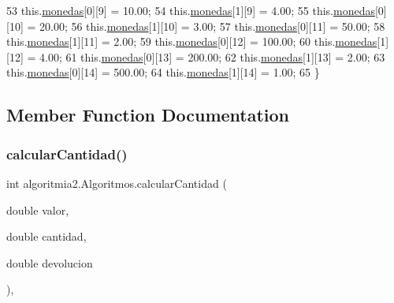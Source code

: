 \begin{DoxyCode}
53         this.\mbox{\hyperlink{classalgoritmia2_1_1_algoritmos_a7c670acfc4ef3b85c2e6908773014a13}{monedas}}[0][9] = 10.00;
54         this.\mbox{\hyperlink{classalgoritmia2_1_1_algoritmos_a7c670acfc4ef3b85c2e6908773014a13}{monedas}}[1][9] = 4.00;
55         this.\mbox{\hyperlink{classalgoritmia2_1_1_algoritmos_a7c670acfc4ef3b85c2e6908773014a13}{monedas}}[0][10] = 20.00;
56         this.\mbox{\hyperlink{classalgoritmia2_1_1_algoritmos_a7c670acfc4ef3b85c2e6908773014a13}{monedas}}[1][10] = 3.00;
57         this.\mbox{\hyperlink{classalgoritmia2_1_1_algoritmos_a7c670acfc4ef3b85c2e6908773014a13}{monedas}}[0][11] = 50.00;
58         this.\mbox{\hyperlink{classalgoritmia2_1_1_algoritmos_a7c670acfc4ef3b85c2e6908773014a13}{monedas}}[1][11] = 2.00;
59         this.\mbox{\hyperlink{classalgoritmia2_1_1_algoritmos_a7c670acfc4ef3b85c2e6908773014a13}{monedas}}[0][12] = 100.00;
60         this.\mbox{\hyperlink{classalgoritmia2_1_1_algoritmos_a7c670acfc4ef3b85c2e6908773014a13}{monedas}}[1][12] = 4.00;
61         this.\mbox{\hyperlink{classalgoritmia2_1_1_algoritmos_a7c670acfc4ef3b85c2e6908773014a13}{monedas}}[0][13] = 200.00;
62         this.\mbox{\hyperlink{classalgoritmia2_1_1_algoritmos_a7c670acfc4ef3b85c2e6908773014a13}{monedas}}[1][13] = 2.00;
63         this.\mbox{\hyperlink{classalgoritmia2_1_1_algoritmos_a7c670acfc4ef3b85c2e6908773014a13}{monedas}}[0][14] = 500.00;
64         this.\mbox{\hyperlink{classalgoritmia2_1_1_algoritmos_a7c670acfc4ef3b85c2e6908773014a13}{monedas}}[1][14] = 1.00;
65     \}
\end{DoxyCode}


\subsection{Member Function Documentation}
\mbox{\label{classalgoritmia2_1_1_algoritmos_ae8d80e3ad2158cb6743bafa0ebbbe3bb}} 
\subsubsection{\texorpdfstring{calcular\+Cantidad()}{calcularCantidad()}}
{\footnotesize\ttfamily int algoritmia2.\+Algoritmos.\+calcular\+Cantidad (\begin{DoxyParamCaption}\item[{double}]{valor,  }\item[{double}]{cantidad,  }\item[{double}]{devolucion }\end{DoxyParamCaption})\hspace{0.3cm}{\ttfamily [inline]}, {\ttfamily [private]}}


